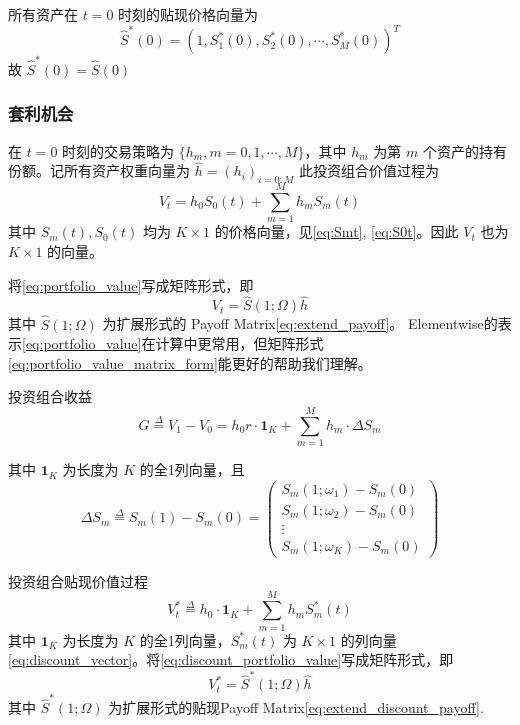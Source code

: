 所有资产在 $t=0$ 时刻的贴现价格向量为
\begin{equation}
\hat{S}^*(0)=(1,S_1^*(0),S_2^*(0),\cdots,S_M^*(0))^T
\label{eq:discount_S0_vec}
\end{equation}
故 $\hat{S}^*(0)=\hat{S}(0)$

\subsubsection{套利机会}

在 $t=0$ 时刻的交易策略为 $\{h_m,m=0,1,\cdots,M\}$，其中 $h_m$ 为第 $m$ 个资产的持有份额。记所有资产权重向量为 $\hat{h}=(h_i)_{i=0:M}$ 此投资组合价值过程为
\begin{equation}
V_t=h_0S_0(t)+\sum_{m=1}^Mh_mS_m(t)
\label{eq:portfolio_value}
\end{equation}
其中 $S_m(t), S_0(t)$ 均为 $K\times 1$ 的价格向量，见\eqref{eq:Smt}, \eqref{eq:S0t}。因此 $V_t$ 也为 $K\times 1$ 的向量。

将\eqref{eq:portfolio_value}写成矩阵形式，即
\begin{equation}
V_t=\hat{S}(1;\Omega)\hat{h}
\label{eq:portfolio_value_matrix_form}
\end{equation}
其中 $\hat{S}(1;\Omega)$ 为扩展形式的 Payoff Matrix\eqref{eq:extend_payoff}。
Elementwise的表示\eqref{eq:portfolio_value}在计算中更常用，但矩阵形式\eqref{eq:portfolio_value_matrix_form}能更好的帮助我们理解。

投资组合收益
\begin{equation}
G\overset{\Delta}{=}V_1-V_0=h_0r\cdot \textbf{1}_K+\sum_{m=1}^M h_m\cdot \Delta S_m
\label{eq:growth}
\end{equation}

其中 $\textbf{1}_K$ 为长度为 $K$ 的全1列向量，且
\begin{equation}
\Delta S_m\overset{\Delta}{=} S_m(1)-S_m(0)=\begin{pmatrix}
    S_m(1;\omega_1)-S_m(0)\\
    S_m(1;\omega_2)-S_m(0)\\
    \vdots\\
    S_m(1;\omega_K)-S_m(0)
\end{pmatrix}
\end{equation}

投资组合贴现价值过程
\begin{equation}
V_t^*\overset{\Delta}{=}h_0\cdot \textbf{1}_K+\sum_{m=1}^M h_m S_m^*(t)
\label{eq:discount_portfolio_value}
\end{equation}
其中 $\textbf{1}_K$ 为长度为 $K$ 的全1列向量，$S_m^*(t)$ 为 $K\times 1$ 的列向量\eqref{eq:discount_vector}。将\eqref{eq:discount_portfolio_value}写成矩阵形式，即
\begin{equation}
V_t^*=\hat{S}^*(1;\Omega)\hat{h}
\label{eq:discount_portfolio_value_matrix_form}
\end{equation}
其中 $\hat{S}^*(1;\Omega)$ 为扩展形式的贴现Payoff Matrix\eqref{eq:extend_discount_payoff}.

